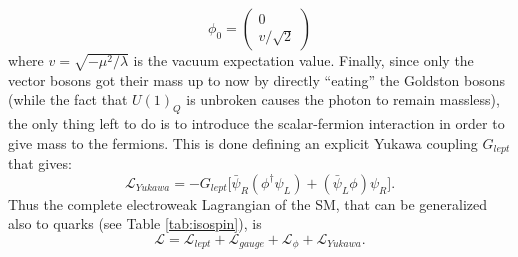 \begin{equation}\label{eq:vacuum}
\phi_{0} = \begin{pmatrix} 0 \\ v/\sqrt{2}
\end{pmatrix}
\end{equation}
where $v = \sqrt{-\mu^{2}/\lambda}$ is 
the vacuum expectation value. Finally, since
only the vector bosons got their mass up to now
by directly ``eating'' the Goldston bosons
(while the fact that $U(1)_{Q}$ is unbroken 
causes the photon to remain massless),
the only thing left to do is to introduce 
the scalar-fermion interaction in order to give
mass to the fermions. This is done defining
an explicit Yukawa coupling $G_{lept}$ that gives:
\begin{equation}\label{eq:lagYukawa}
\mathcal{L}_{Yukawa} = -G_{lept}\big[\bar\psi_{R}(\phi^{\dag}\psi_{L}) + (\bar\psi_{L}\phi)\psi_{R}\big] .
\end{equation}Thus the complete electroweak Lagrangian of the SM, that can be generalized also to quarks (see Table \ref{tab:isospin}), is\begin{equation}\label{eq:lagSM}
\mathcal{L}= \mathcal{L}_{lept} +\mathcal{L}_{gauge} +\mathcal{L}_{\phi} +\mathcal{L}_{Yukawa}.
\end{equation}


